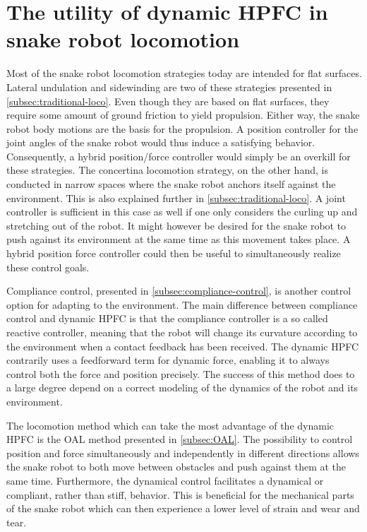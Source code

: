 \section{The utility of dynamic HPFC in snake robot locomotion}

Most of the snake robot locomotion strategies today are intended for flat surfaces. Lateral undulation and sidewinding are two of these strategies presented in \ref{subsec:traditional-loco}. Even though they are based on flat surfaces, they require some amount of ground friction to yield propulsion. Either way, the snake robot body motions are the basis for the propulsion. A position controller for the joint angles of the snake robot would thus induce a satisfying behavior. Consequently, a hybrid position/force controller would simply be an overkill for these strategies. The concertina locomotion strategy, on the other hand, is conducted in narrow spaces where the snake robot anchors itself against the environment. This is also explained further in \ref{subsec:traditional-loco}. A joint controller is sufficient in this case as well if one only considers the curling up and stretching out of the robot. It might however be desired for the snake robot to push against its environment at the same time as this movement takes place. A hybrid position force controller could then be useful to simultaneously realize these control goals.

Compliance control, presented in \ref{subsec:compliance-control}, is another control option for adapting to the environment. The main difference between compliance control and dynamic HPFC is that the compliance controller is a so called reactive controller, meaning that the robot will change its curvature according to the environment when a contact feedback has been received. The dynamic HPFC contrarily uses a feedforward term for dynamic force, enabling it to always control both the force and position precisely. The success of this method does to a large degree depend on a correct modeling of the dynamics of the robot and its environment.

The locomotion method which can take the most advantage of the dynamic HPFC is the OAL method presented in \ref{subsec:OAL}. The possibility to control position and force simultaneously and independently in different directions allows the snake robot to both move between obstacles and push against them at the same time. Furthermore, the dynamical control facilitates a dynamical or compliant, rather than stiff, behavior. This is beneficial for the mechanical parts of the snake robot which can then experience a lower level of strain and wear and tear. 


